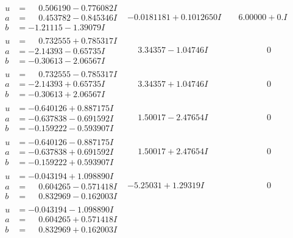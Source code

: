 \documentclass[1p]{elsarticle_modified}
\theoremstyle{definition}
\begin{document}
$$\begin{array}{c|c|c}
\begin{aligned}
u &= \phantom{-}0.506190 - 0.776082 I \\
a &= \phantom{-}0.453782 - 0.845346 I \\
b &= -1.21115 - 1.39079 I\end{aligned}
 & -0.0181181 + 0.1012650 I & \phantom{-}6.00000 + 0. I\phantom{ +0.000000I} \\ \hline\begin{aligned}
u &= \phantom{-}0.732555 + 0.785317 I \\
a &= -2.14393 - 0.65735 I \\
b &= -0.30613 - 2.06567 I\end{aligned}
 & \phantom{-}3.34357 - 1.04746 I & \phantom{-0.000000 } 0 \\ \hline\begin{aligned}
u &= \phantom{-}0.732555 - 0.785317 I \\
a &= -2.14393 + 0.65735 I \\
b &= -0.30613 + 2.06567 I\end{aligned}
 & \phantom{-}3.34357 + 1.04746 I & \phantom{-0.000000 } 0 \\ \hline\begin{aligned}
u &= -0.640126 + 0.887175 I \\
a &= -0.637838 - 0.691592 I \\
b &= -0.159222 - 0.593907 I\end{aligned}
 & \phantom{-}1.50017 - 2.47654 I & \phantom{-0.000000 } 0 \\ \hline\begin{aligned}
u &= -0.640126 - 0.887175 I \\
a &= -0.637838 + 0.691592 I \\
b &= -0.159222 + 0.593907 I\end{aligned}
 & \phantom{-}1.50017 + 2.47654 I & \phantom{-0.000000 } 0 \\ \hline\begin{aligned}
u &= -0.043194 + 1.098890 I \\
a &= \phantom{-}0.604265 - 0.571418 I \\
b &= \phantom{-}0.832969 - 0.162003 I\end{aligned}
 & -5.25031 + 1.29319 I & \phantom{-0.000000 } 0 \\ \hline\begin{aligned}
u &= -0.043194 - 1.098890 I \\
a &= \phantom{-}0.604265 + 0.571418 I \\
b &= \phantom{-}0.832969 + 0.162003 I\end{aligned}

\end{array}$$
\end{document}
